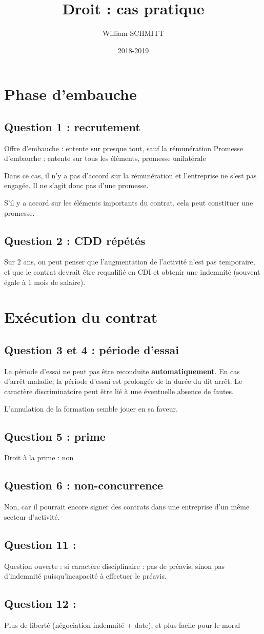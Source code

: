 \documentclass[11pt]{article}
\title{Droit : cas pratique}
\author{William SCHMITT}
\date{2018-2019}
\begin{document}
\maketitle

\section{Phase d'embauche}
\subsection*{Question 1 : recrutement}
Offre d'embauche : entente sur presque tout, sauf la rémunération
Promesse d'embauche : entente sur tous les éléments, promesse unilatérale

Dans ce cas, il n'y a pas d'accord sur la rémunération et l'entreprise ne s'est pas engagée. Il ne s'agit donc pas d'une promesse.

S'il y a accord sur les éléments importants du contrat, cela peut constituer une promesse.

\subsection*{Question 2 : CDD répétés}
Sur 2 ans, on peut penser que l'augmentation de l'activité n'est pas temporaire, et que le contrat devrait être requalifié en CDI et obtenir une indemnité (souvent égale à 1 mois de salaire).

\section{Exécution du contrat}
\subsection*{Question 3 et 4 : période d'essai}
La période d'essai ne peut pas être reconduite \textbf{automatiquement}. En cas d'arrêt maladie, la période d'essai est prolongée de la durée du dit arrêt. 
Le caractère discriminatoire peut être lié à une éventuelle absence de fautes.

L'annulation de la formation semble jouer en sa faveur.

\subsection*{Question 5 : prime}
Droit à la prime : non

\subsection*{Question 6 : non-concurrence}
Non, car il pourrait encore signer des contrats dans une entreprise d'un même secteur d'activité.

\subsection*{Question 11 : }
Question ouverte : si caractère disciplinaire : pas de préavis, sinon pas d'indemnité puisqu'incapacité à effectuer le préavis.

\subsection*{Question 12 :}
Plus de liberté (négociation indemnité + date), et plus facile pour le moral
\end{document}
